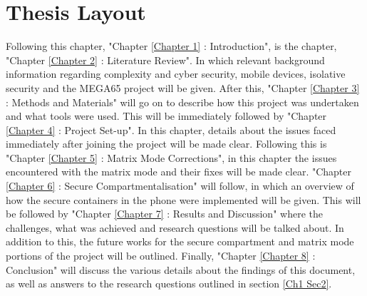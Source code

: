 \section{Thesis Layout}

\label{Ch1 Sec3}

Following this chapter, "Chapter \ref{Chapter 1} : Introduction", is the chapter, "Chapter \ref{Chapter 2} : Literature Review".
In which relevant background information regarding complexity and cyber security, mobile devices, isolative security and the MEGA65 project will be given.
After this, "Chapter \ref{Chapter 3} : Methods and Materials" will go on to describe how this project was undertaken and what tools were used.
This will be immediately followed by "Chapter \ref{Chapter 4} : Project Set-up".
In this chapter, details about the issues faced immediately after joining the project will be made clear.
Following this is "Chapter \ref{Chapter 5} : Matrix Mode Corrections", in this chapter the issues encountered with the matrix mode and their fixes will be made clear.
"Chapter \ref{Chapter 6} : Secure Compartmentalisation" will follow, in which an overview of how the secure containers in the phone were implemented will be given.
This will be followed by "Chapter \ref{Chapter 7} : Results and Discussion" where the challenges, what was achieved and research questions will be talked about. In addition to this, the future works for the secure compartment and matrix mode portions of the project will be outlined.
Finally, "Chapter \ref{Chapter 8} : Conclusion" will discuss the various details about the findings of this document, as well as answers to the research questions outlined in section \ref{Ch1 Sec2}.

